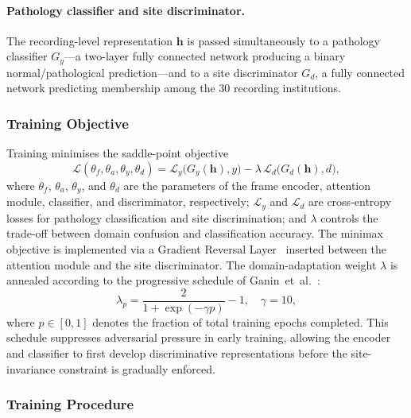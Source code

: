 \documentclass[preprint,12pt]{elsarticle}
\begin{document}
\paragraph{Pathology classifier and site discriminator.}
The recording-level representation $\mathbf{h}$ is passed
simultaneously to a pathology classifier $G_y$---a two-layer fully
connected network producing a binary normal/pathological
prediction---and to a site discriminator $G_d$, a fully connected
network predicting membership among the 30 recording institutions.

\subsubsection{Training Objective}
\label{subsubsec:dann_training}

Training minimises the saddle-point objective
\begin{equation}
  \mathcal{L}(\theta_f,\theta_a,\theta_y,\theta_d) =
      \mathcal{L}_y\!\bigl(G_y(\mathbf{h}),y\bigr)
      - \lambda\,\mathcal{L}_d\!\bigl(G_d(\mathbf{h}),d\bigr),
  \label{eq:dann_minet}
\end{equation}
where $\theta_f$, $\theta_a$, $\theta_y$, and $\theta_d$ are the
parameters of the frame encoder, attention module, classifier, and
discriminator, respectively; $\mathcal{L}_y$ and $\mathcal{L}_d$ are
cross-entropy losses for pathology classification and site
discrimination; and $\lambda$ controls the trade-off between domain
confusion and classification accuracy.
The minimax objective is implemented via a Gradient Reversal
Layer~\cite{ganin2016domain} inserted between the attention module
and the site discriminator.
The domain-adaptation weight $\lambda$ is annealed according to the
progressive schedule of Ganin~et~al.~\cite{ganin2016domain}:
\begin{equation}
  \lambda_p = \frac{2}{1 + \exp(-\gamma p)} - 1, \quad \gamma = 10,
  \label{eq:lambda_schedule}
\end{equation}
where $p \in [0,1]$ denotes the fraction of total training epochs
completed.
This schedule suppresses adversarial pressure in early training,
allowing the encoder and classifier to first develop discriminative
representations before the site-invariance constraint is gradually
enforced.

\subsubsection{Training Procedure}
\label{subsubsec:dann_procedure}
\end{document}
